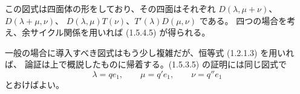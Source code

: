 この図式は四面体の形をしており、その四面はそれぞれ
$D(\lambda,\mu+\nu)$、$D(\lambda+\mu,\nu)$、
$D(\lambda,\mu)T(\nu)$、$T'(\lambda)D(\mu,\nu)$ である。
四つの場合を考え、余サイクル関係を用いれば (1.5.4.5) が得られる。

一般の場合に導入すべき図式はもう少し複雑だが、恒等式 (1.2.1.3) を用いれば、
論証は上で概説したものに帰着する。(1.5.3.5) の証明には同じ図式で
\[
  \lambda=qe_1,\qquad \mu=q'e_1,\qquad \nu=q''e_1
\]
とおけばよい。
